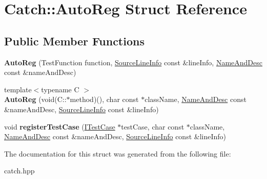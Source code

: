 \hypertarget{struct_catch_1_1_auto_reg}{}\section{Catch\+:\+:Auto\+Reg Struct Reference}
\label{struct_catch_1_1_auto_reg}
\subsection*{Public Member Functions}
\begin{DoxyCompactItemize}
\item 
\mbox{\label{struct_catch_1_1_auto_reg_af224f4568d57b8652474df475a164a8c}} 
{\bfseries Auto\+Reg} (Test\+Function function, \hyperlink{struct_catch_1_1_source_line_info}{Source\+Line\+Info} const \&line\+Info, \hyperlink{struct_catch_1_1_name_and_desc}{Name\+And\+Desc} const \&name\+And\+Desc)
\item 
\mbox{\label{struct_catch_1_1_auto_reg_a1bf9207fe0a02b46dc0ab1cc03cbe738}} 
{\footnotesize template$<$typename C $>$ }\\{\bfseries Auto\+Reg} (void(C\+::$\ast$method)(), char const $\ast$class\+Name, \hyperlink{struct_catch_1_1_name_and_desc}{Name\+And\+Desc} const \&name\+And\+Desc, \hyperlink{struct_catch_1_1_source_line_info}{Source\+Line\+Info} const \&line\+Info)
\item 
\mbox{\label{struct_catch_1_1_auto_reg_a2dc6a03e838b31e29fcd6a740195b55b}} 
void {\bfseries register\+Test\+Case} (\hyperlink{struct_catch_1_1_i_test_case}{I\+Test\+Case} $\ast$test\+Case, char const $\ast$class\+Name, \hyperlink{struct_catch_1_1_name_and_desc}{Name\+And\+Desc} const \&name\+And\+Desc, \hyperlink{struct_catch_1_1_source_line_info}{Source\+Line\+Info} const \&line\+Info)
\end{DoxyCompactItemize}


The documentation for this struct was generated from the following file\+:\begin{DoxyCompactItemize}
\item 
catch.\+hpp\end{DoxyCompactItemize}
